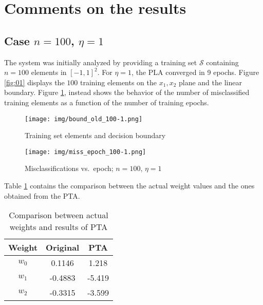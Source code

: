 \documentclass[12pt]{article}
\begin{document}
\section{Comments on the results}

\subsection{Case $n=100$, $\eta=1$}
\label{sec:100-1}

The system was initially analyzed by providing a training set $\mathcal{S}$ containing $n = 100$ elements in ${[-1, 1]}^{2}$.
For $\eta = 1$, the PLA converged in 9 epochs.
Figure \ref{fig:01} displays the $100$ training elements on the $x_1, x_2$ plane and the linear boundary.
Figure \ref{fig:02}, instead shows the behavior of the number of misclassified training elements as a function of the number of training epochs.

\begin{figure} [ht]
    \begin{minipage}{0.45\linewidth}
    \centering
        \texttt{[image: img/bound\_old\_100-1.png]}
        \caption{Training set elements and decision boundary}
        \label{fig:01}
    \end{minipage}
    \hspace{0.5cm}
    \begin{minipage}{0.45\linewidth}
    \centering
        \texttt{[image: img/miss\_epoch\_100-1.png]}
        \caption{Misclassifications vs.\ epoch; $n=100$, $\eta=1$}
        \label{fig:02}
    \end{minipage}
\end{figure}

Table \ref{tab:01} contains the comparison between the actual weight values and the ones obtained from the PTA.

\begin{table}[h]
    \centering
    \begin{tabular}{|c|c|c|}
        \hline
        Weight & \textbf{Original} & \textbf{PTA} \\ 
        \hline
        \hline
        $w_0$ & 0.1146 & 1.218 \\
        \hline
        $w_1$ & -0.4883 & -5.419 \\
        \hline
        $w_2$ & -0.3315 & -3.599 \\
        \hline
    \end{tabular}
    \caption{Comparison between actual weights and results of PTA}
    \label{tab:01}
\end{table}
\end{document}
